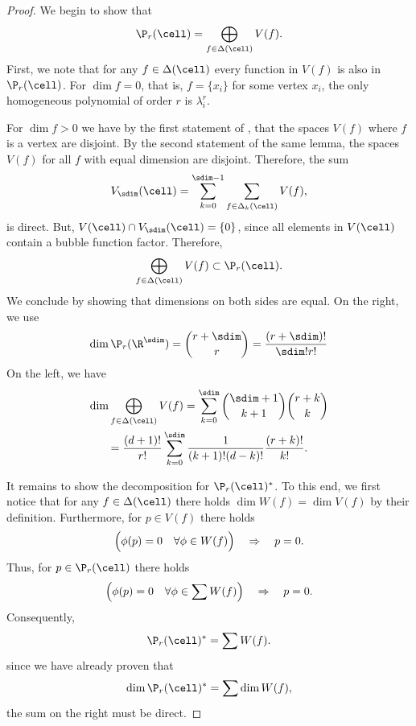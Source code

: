 \begin{proof}
  We begin to show that
  \begin{gather}
    \P_r(\cell) = \bigoplus_{f\in\Delta(\cell)}V(f).
  \end{gather}
  First, we note that for any $f\in\Delta(\cell)$ every function in $V(f)$
  is also in $\P_r(\cell)$.  For $\dim f=0$, that is, $f=\{x_i\}$ for some
  vertex $x_i$, the only homogeneous polynomial of order $r$ is $\lambda_i^r$.

  For $\dim f > 0$ we have by the first statement of
  , that the spaces $V(f)$
  where $f$ is a vertex are disjoint. By the second statement of the
  same lemma, the spaces $V(f)$ for all $f$ with equal dimension are
  disjoint. Therefore, the sum
  \begin{gather}
    V_\sdim(\cell) = \sum_{k=0}^{\sdim-1} \sum_{f\in \Delta_k(\cell)} V(f),
  \end{gather}
  is direct. But, $V(\cell) \cap V_\sdim(\cell) = \{0\}$, since all elements in
  $V(\cell)$ contain a bubble function factor. Therefore,
  \begin{gather}
    \bigoplus_{f\in\Delta(\cell)}V(f) \subset \P_r(\cell).
  \end{gather}
  We conclude by showing that dimensions on both sides are equal.
  On the right, we use
  \begin{gather}
    \dim \P_r(\R^\sdim) = \binom{r+\sdim}{r} = \frac{(r+\sdim)!}{\sdim!r!}
  \end{gather}
  On the left, we have
  \begin{multline}
    \dim \bigoplus_{f\in\Delta(\cell)}V(f) =
    \sum_{k=0}^{\sdim} \binom{\sdim+1}{k+1} \binom{r+k}{k}
    \\
    = \frac{(d+1)!}{r!}
    \sum_{k=0}^{\sdim} \frac{1}{(k+1)!(d-k)!} \frac{(r+k)!}{k!}.
  \end{multline}


  It remains to show the decomposition for $\P_r(\cell)^*$. To this
  end, we first notice that for any $f\in\Delta(\cell)$ there holds
  $\dim W(f) = \dim V(f)$ by their definition. Furthermore, for
  $p\in V(f)$ there holds
  \begin{gather}
    \Bigl(\phi(p) = 0 \quad\forall \phi\in W(f)\Bigr)
    \quad\Rightarrow\quad
    p=0.
  \end{gather}
  Thus, for $p\in \P_r(\cell)$ there holds
  \begin{gather}
    \Bigl(\phi(p) = 0 \quad\forall \phi\in \sum W(f)\Bigr)
    \quad\Rightarrow\quad
    p=0.
  \end{gather}
  Consequently,
  \begin{gather}
    \P_r(\cell)^* = \sum W(f).
  \end{gather}
  since we have already proven that
  \begin{gather}
    \dim \P_r(\cell)^* = \sum \dim W(f),
  \end{gather}
  the sum on the right must be direct.
\end{proof}


